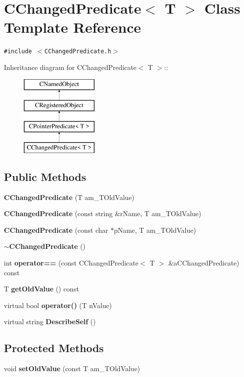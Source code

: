 \section{CChanged\-Predicate$<$ T $>$  Class Template Reference}
\label{classCChangedPredicate}
{\tt \#include $<$CChanged\-Predicate.h$>$}

Inheritance diagram for CChanged\-Predicate$<$ T $>$::\begin{figure}[H]
\begin{center}
\leavevmode
\includegraphics[height=4cm]{classCChangedPredicate}
\end{center}
\end{figure}
\subsection*{Public Methods}
\begin{CompactItemize}
\item 
{\bf CChanged\-Predicate} (T am\_\-TOld\-Value)
\item 
{\bf CChanged\-Predicate} (const string \&r\-Name, T am\_\-TOld\-Value)
\item 
{\bf CChanged\-Predicate} (const char $\ast$p\-Name, T am\_\-TOld\-Value)
\item 
{\bf $\sim$CChanged\-Predicate} ()
\item 
int {\bf operator==} (const CChanged\-Predicate$<$ T $>$ \&a\-CChanged\-Predicate) const
\item 
T {\bf get\-Old\-Value} () const
\item 
virtual bool {\bf operator()} (T n\-Value)
\item 
virtual string {\bf Describe\-Self} ()
\end{CompactItemize}
\subsection*{Protected Methods}
\begin{CompactItemize}
\item 
void {\bf set\-Old\-Value} (const T am\_\-TOld\-Value)
\end{CompactItemize}
